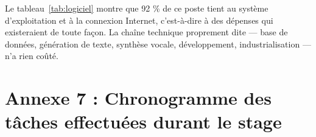 Le tableau~\ref{tab:logiciel} montre que 92 \% de ce poste tient au système
d'exploitation et à la connexion Internet, c'est-à-dire à des dépenses qui
existeraient de toute façon. La chaîne technique proprement dite — base de
données, génération de texte, synthèse vocale, développement,
industrialisation — n'a rien coûté.


\cleardoublepage
\chapter*{Annexe 7 : Chronogramme des tâches effectuées durant le stage}

\vspace{0.3cm}

